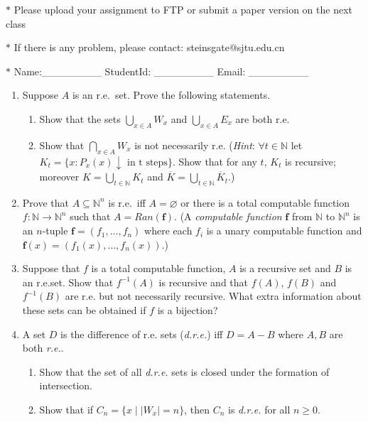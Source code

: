 \documentclass[12pt,a4paper]{article}
\theoremstyle{definition}
\numberwithin{equation}{section}
\numberwithin{figure}{section}
\begin{document}
\noindent

\noindent{}
\begin{center}
\footnotesize{\color{red}$*$ Please upload your assignment to FTP or submit a paper version on the next class}

\footnotesize{\color{red}$*$ If there is any problem, please contact: steinsgate@sjtu.edu.cn}

\footnotesize{\color{blue}$*$ Name:\_\_\_\_\_\_\_\_ \quad StudentId: \_\_\_\_\_\_\_\_ \quad Email: \_\_\_\_\_\_\_\_}
\end{center}

\begin{enumerate}
\item Suppose $A$ is an r.e.~set. Prove the following statements.
\begin{enumerate}
\item Show that the sets $\bigcup\limits_{x\in A}W_x$ and $\bigcup\limits_{x\in A}E_x$ are both r.e.
\item Show that $\bigcap\limits_{x\in A}W_x$ is not necessarily r.e. (\emph{Hint}: $\forall t \in \mathbb{N}$ let $K_t=\{x:P_x(x)\downarrow \mbox{ in t steps}\}$. Show that for any $t$, $K_t$ is recursive; moreover $K=\bigcup\limits_{t\in\mathbb{N}}K_t$ and $\overline{K}=\bigcup\limits_{t\in\mathbb{N}}\overline{K}_t$.)
\end{enumerate}

\item Prove that $A\subseteq\mathbb{N}^n$ is r.e.~iff $A=\varnothing$ or there is a total computable function $f:\mathbb{N}\rightarrow\mathbb{N}^n$ such that $A=Ran(\bm{f})$. (A \emph{computable function} $\bm{f}$ from $\mathbb{N}$ to $\mathbb{N}^n$ is an $n$-tuple $\bm{f}=(f_1,\ldots,f_n)$ where each $f_i$ is a unary computable function and $\bm{f}(x)=(f_1(x),\ldots,f_n(x))$.)

\item Suppose that $f$ is a total computable function, $A$ is a recursive set and $B$ is an r.e.set. Show that $f^{-1}(A)$ is recursive and that $f(A)$, $f(B)$ and $f^{-1}(B)$ are r.e. but not necessarily recursive. What extra information about these sets can be obtained if $f$ is a bijection?

\item A set $D$ is the difference of r.e. sets (\emph{d.r.e.}) iff $D=A-B$ where $A,B$ are both \emph{r.e.}.
\begin{enumerate}
\item Show that the set of all \emph{d.r.e.} sets is closed under the formation of intersection.
\item Show that if $C_n = \{x \mid |W_x|=n \}$, then $C_n$ is \emph{d.r.e.} for all $n \ge 0$.
\end{enumerate}



\end{enumerate}
\end{document}

